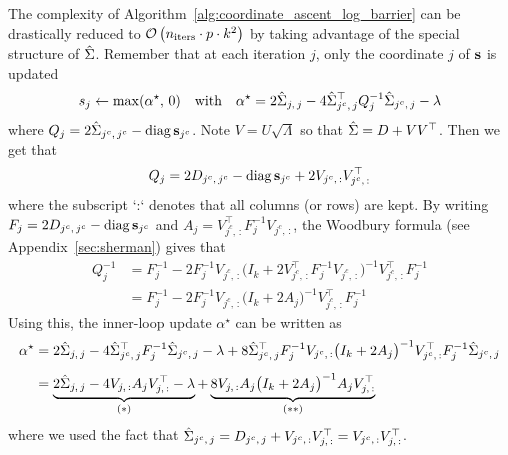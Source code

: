 The complexity of Algorithm~\ref{alg:coordinate_ascent_log_barrier} can be drastically reduced
to $\mathcal{O}\left( n_\text{iters} \cdot p \cdot k^2 \right)$
by taking advantage of the special structure of $\hat{\Sigma}$.
Remember that at each iteration $j$,
only the coordinate $j$ of $\mathbf{s}$ is updated
\begin{equation*}
    s_j \leftarrow \max(\alpha^\star,\, 0)
    \quad\text{with}\quad
    \alpha^\star = 2\hat{\Sigma}_{j,\, j} - 4\hat{\Sigma}_{j^c,\, j}^\top Q_j^{-1} \hat{\Sigma}_{j^c,\, j} - \lambda
\end{equation*}
where $Q_j = 2\hat{\Sigma}_{j^c,\, j^c} - \operatorname*{diag}\mathbf{s}_{j^c}$.
Note $V = U \sqrt{\Lambda}$ so that $\hat{\Sigma} = D + VV^\top$.
Then we get that
\begin{equation*}
    Q_j = 2D_{j^c,\, j^c} - \operatorname*{diag}\mathbf{s}_{j^c} + 2V_{j^c,\, :}V_{j^c,\, :}^\top
\end{equation*}
where the subscript `:` denotes that all columns (or rows) are kept.
By writing $F_j = 2D_{j^c,\, j^c} - \operatorname*{diag}\mathbf{s}_{j^c}$ and $A_j = V_{j^c,\, :}^\top F_j^{-1} V_{j^c,\, :}$,
the Woodbury formula (see Appendix~\ref{sec:sherman}) gives that
\begin{align*}
    Q_j^{-1} &=
        F_j^{-1} - 2F_j^{-1}V_{j^c,\, :}
            \big( I_k + 2V_{j^c,\, :}^\top F_j^{-1} V_{j^c,\, :} \big)^{-1}
                V_{j^c,\, :}^\top F_j^{-1}\\
    &= F_j^{-1} - 2F_j^{-1}V_{j^c,\, :}
        \big( I_k + 2A_j \big)^{-1}
            V_{j^c,\, :}^\top F_j^{-1}
\end{align*}
Using this, the inner-loop update $\alpha^\star$ can be written as
\begin{align}\label{eq:low_rank_alpha}
    \alpha^\star &=
        2\hat{\Sigma}_{j,\, j}
        - 4\hat{\Sigma}_{j^c,\, j}^\top F_j^{-1} \hat{\Sigma}_{j^c,\, j}
        - \lambda
        + 8\hat{\Sigma}_{j^c,\, j}^\top F_j^{-1} V_{j^c,\, :}
        \big( I_k + 2A_j \big)^{-1}
        V_{j^c,\, :}^\top F_j^{-1}\hat{\Sigma}_{j^c,\, j}\nonumber\\[5pt]
    &= \underbrace{
        2\hat{\Sigma}_{j,\, j}
        - 4V_{j,\, :} A_j V_{j,\, :}^\top
        - \lambda
    }_\text{$(*)$}
    + \underbrace{8V_{j,\, :} A_j
        \big( I_k + 2A_j \big)^{-1}
        A_j V_{j,\, :}^\top
    }_\text{$(**)$}
\end{align}
where we used the fact that
$\hat{\Sigma}_{j^c,\, j} = D_{j^c,\, j} + V_{j^c,\, :}V_{j,\, :}^\top = V_{j^c,\, :}V_{j,\, :}^\top$.

